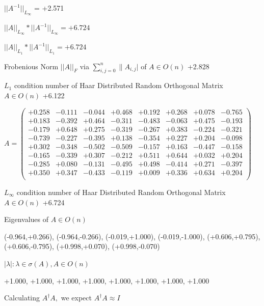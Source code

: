 \documentclass[9pt]{article}
\theoremstyle{plain}
\theoremstyle{definition}
\theoremstyle{remark}
\numberwithin{equation}{section}
\begin{document}
$||A^{-1}||_{L_{\infty}}$ = +2.571

$||A||_{L_{\infty}} * ||A^{-1}||_{L_{\infty}} = +6.724$

$||A||_{L_1} * ||A^{-1}||_{L_1} = +6.724$

Frobenious Norm  $||A||_{\textit{F}}$ via $\sum\limits_{i,j =0}^{n} \|A_{i,j}|$   of  $A \in O(n)$  +2.828

$L_1$ condition number of Haar Distributed Random Orthogonal Matrix $A \in O(n)$ +6.122

$A = \left(
\begin{array}{
cccccccc}
+0.258 & -0.111 & -0.044 & +0.468 & +0.192 & +0.268 & +0.078 & -0.765 \\
+0.183 & -0.392 & +0.464 & -0.311 & -0.483 & -0.063 & +0.475 & -0.193 \\
-0.179 & +0.648 & +0.275 & -0.319 & -0.267 & +0.383 & -0.224 & -0.321 \\
-0.739 & -0.227 & -0.395 & +0.138 & -0.354 & +0.227 & +0.204 & -0.098 \\
+0.302 & -0.348 & -0.502 & -0.509 & -0.157 & +0.163 & -0.447 & -0.158 \\
-0.165 & -0.339 & +0.307 & -0.212 & +0.511 & +0.644 & +0.032 & +0.204 \\
-0.285 & +0.080 & -0.131 & -0.495 & +0.498 & -0.414 & +0.271 & -0.397 \\
+0.350 & +0.347 & -0.433 & -0.119 & +0.009 & +0.336 & +0.634 & +0.204 \\
\end{array}
\right)$ \newline 

$L_{\infty}$ condition number of Haar Distributed Random Orthogonal Matrix $A \in O(n)$ +6.724

Eigenvalues of $A \in O(n)$

(-0.964,+0.266), (-0.964,-0.266), (-0.019,+1.000), (-0.019,-1.000), (+0.606,+0.795), (+0.606,-0.795), (+0.998,+0.070), (+0.998,-0.070)

 $|\lambda | : \lambda \in \sigma(A) , A \in O(n)$

+1.000, +1.000, +1.000, +1.000, +1.000, +1.000, +1.000, +1.000


Calculating $A^{\dag} A,$  we expect $A^{\dag} A \approx I$
\end{document}
